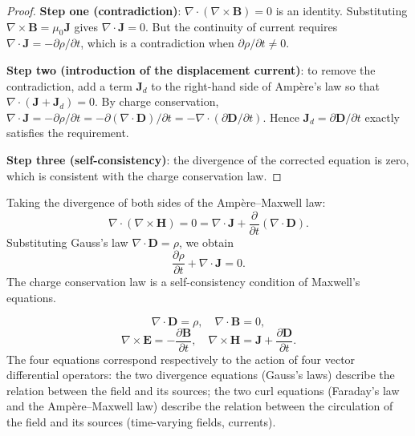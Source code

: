 \begin{proof}
\textbf{Step one (contradiction)}: $\nabla \cdot (\nabla \times \mathbf{B}) = 0$ is an identity. Substituting $\nabla \times \mathbf{B} = \mu_0 \mathbf{J}$ gives $\nabla \cdot \mathbf{J} = 0$. But the continuity of current requires $\nabla \cdot \mathbf{J} = -\partial\rho/\partial t$, which is a contradiction when $\partial\rho/\partial t \neq 0$.

\textbf{Step two (introduction of the displacement current)}: to remove the contradiction, add a term $\mathbf{J}_d$ to the right-hand side of Amp\`ere's law so that $\nabla \cdot (\mathbf{J} + \mathbf{J}_d) = 0$. By charge conservation, $\nabla \cdot \mathbf{J} = -\partial\rho/\partial t = -\partial(\nabla\cdot\mathbf{D})/\partial t = -\nabla \cdot (\partial\mathbf{D}/\partial t)$. Hence $\mathbf{J}_d = \partial\mathbf{D}/\partial t$ exactly satisfies the requirement.

\textbf{Step three (self-consistency)}: the divergence of the corrected equation is zero, which is consistent with the charge conservation law.
\end{proof}

\begin{corollary}\label{cor:charge_conservation}
Taking the divergence of both sides of the Amp\`ere--Maxwell law:
\[
\nabla \cdot (\nabla \times \mathbf{H}) = 0 = \nabla \cdot \mathbf{J} + \frac{\partial}{\partial t}(\nabla \cdot \mathbf{D}).
\]
Substituting Gauss's law $\nabla \cdot \mathbf{D} = \rho$, we obtain
\[
\boxed{\frac{\partial \rho}{\partial t} + \nabla \cdot \mathbf{J} = 0}.
\]
The charge conservation law is a self-consistency condition of Maxwell's equations.
\end{corollary}

\begin{theorem}\label{thm:maxwell_equations}
\[
\boxed{\nabla \cdot \mathbf{D} = \rho}, \quad \boxed{\nabla \cdot \mathbf{B} = 0},
\]
\[
\boxed{\nabla \times \mathbf{E} = -\frac{\partial \mathbf{B}}{\partial t}}, \quad \boxed{\nabla \times \mathbf{H} = \mathbf{J} + \frac{\partial \mathbf{D}}{\partial t}}.
\]
The four equations correspond respectively to the action of four vector differential operators: the two divergence equations (Gauss's laws) describe the relation between the field and its sources; the two curl equations (Faraday's law and the Amp\`ere--Maxwell law) describe the relation between the circulation of the field and its sources (time-varying fields, currents).
\end{theorem}

